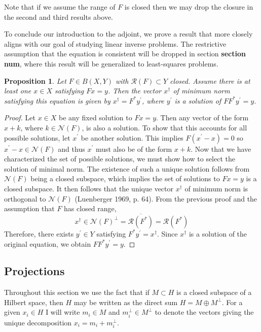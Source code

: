\documentclass[12pt]{article}
\newtheorem{prop}{Proposition}
\begin{document}
Note that if we assume the range of $F$ is closed then we may drop the closure in the second and third
results above. 

To conclude our introduction to the adjoint, we prove a result that more closely aligns with our goal of studying 
linear inverse problems. The restrictive assumption that the equation is consistent will be dropped in section
\textbf{section num}, where this result will be generalized to least-squares problems. 
\begin{prop} 
Let $F \in B(X, Y)$ with $\mathcal{R}(F) \subset Y$ closed. Assume there is at least one $x \in X$ satisfying
$Fx = y$. Then the vector $x^\dagger$ of minimum norm satisfying this equation is given by 
$x^\dagger = F^*y^\prime$, where $y^\prime$ is a solution of $FF^*y^\prime = y$. 
\end{prop} 

\begin{proof} 
Let $x \in X$ be any fixed solution to $Fx = y$. Then any vector of the form $x + k$, where $k \in \mathcal{N}(F)$, 
is also a solution. To show that this accounts for all possible solutions, let $x^\prime$ be another solution. 
This implies $F(x^\prime - x) = 0$ so $x^\prime - x \in \mathcal{N}(F)$ and thus $x^\prime$ must also be of the form 
$x + k$. Now that we have characterized the set of possible solutions, we must show how to select the solution
of minimal norm. The existence of such a unique solution follows from $\mathcal{N}(F)$ being a closed subspace, 
which implies the set of solutions to $Fx = y$ is a closed subspace. It then follows that the unique vector $x^\dagger$
of minimum norm is orthogonal to $\mathcal{N}(F)$ (Luenberger 1969, p. 64). From the previous proof and the assumption
that $F$ has closed range, \[x^\dagger \in \mathcal{N}(F)^\perp = \overline{\mathcal{R}(F^*)} = \mathcal{R}(F^*)\]
Therefore, there exists $y^\prime \in Y$ satisfying $F^*y^\prime = x^\dagger$. Since $x^\dagger$ is a solution of 
the original equation, we obtain $FF^*y^\prime = y$. 
\end{proof} 

\subsection{Projections}

Throughout this section we use the fact that if $M \subset H$ is a closed subspace of a Hilbert space, then 
$H$ may be written as the direct sum $H = M \oplus M^\perp$. For a given $x_i \in H$ I will write $m_i \in M$ and 
$m_i^\perp \in M^\perp$ to denote the vectors giving the unique decomposition $x_i = m_i + m_i^\perp$. 
\end{document}

